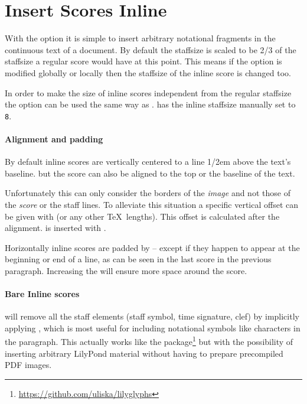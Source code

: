 \section*{Insert Scores Inline}

With the  option it is simple to insert arbitrary
notational fragments in the  continuous text of a
document. By default the staffsize is scaled to be 2/3 of the staffsize a
regular score would have at this point. This means if the 
option is modified globally or locally then the staffsize of the inline score is
changed too.

In order to make the size of inline scores independent from the regular
staffsize the option  can be used the same way as
.  has the inline
staffsize manually set to \texttt{8}.

\paragraph{Alignment and padding} By default inline scores are vertically
centered to a line 1/2em above the text's baseline.  but the score can also be aligned  to the top or the baseline of the text.

Unfortunately this can only consider the borders of the \emph{image} and not
those of the \emph{score} or the staff lines. To alleviate this situation a
specific vertical offset can be given with  (or any other
\TeX\ lengths). This offset is calculated after the alignment.
 is inserted with
.

Horizontally inline scores are padded by  -- except if
they happen to appear at the beginning or end of a line, as can be seen in the
last score in the previous paragraph. 
Increasing the  will ensure more space around the score.

\paragraph{Bare Inline scores}  will remove all the
staff elements (staff symbol, time signature, clef) by implicitly applying
, which is most useful for including notational symbols like
characters in the paragraph.
This actually works like the 
package\footnote{\url{https://github.com/uliska/lilyglyphs}} but with the
possibility of inserting arbitrary LilyPond material without having to prepare
precompiled PDF images.
